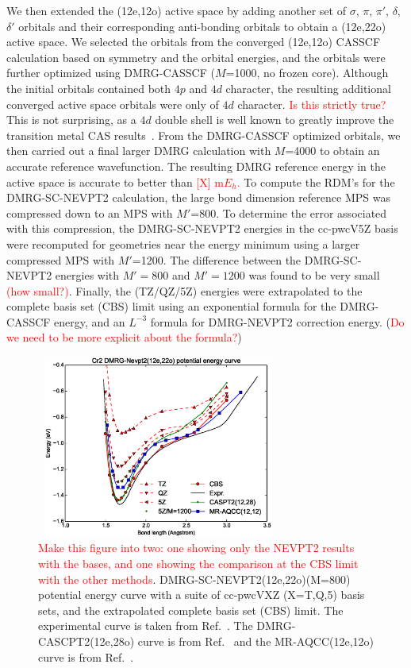 We then extended the (12e,12o) active space by adding another set of $\sigma$, $\pi$, $\pi'$, $\delta$, $\delta'$ orbitals and their corresponding anti-bonding orbitals 
to obtain a (12e,22o) active space. We selected the orbitals from the converged (12e,12o) CASSCF calculation based on symmetry and the orbital energies,
and the orbitals were further optimized using DMRG-CASSCF ($M$=1000, no frozen core). Although the initial orbitals contained both $4p$ and $4d$ character, 
the resulting additional converged active space orbitals were only of $4d$ character. \textcolor{red}{Is this strictly true?} This is not surprising, as a $4d$ double shell is well known to greatly improve the transition metal CAS results~\cite{andersson_excitation_1992}.
From the DMRG-CASSCF optimized orbitals, we then carried out a final larger DMRG calculation with $M$=4000 to obtain an accurate reference wavefunction.
The resulting DMRG reference energy in the active space is accurate to better than \textcolor{red}{[X] m$E_h$.}
To compute the RDM's for the DMRG-SC-NEVPT2 calculation, the large bond dimension reference MPS was compressed down to an MPS with $M'$=800. 
To determine the error associated with this compression, the DMRG-SC-NEVPT2 energies in the cc-pwcV5Z basis 
were recomputed for geometries near the energy minimum using a larger compressed MPS with $M'$=1200. The difference between the DMRG-SC-NEVPT2 energies with $M'=800$ and $M'=1200$ 
was found to be very small \textcolor{red}{(how small?)}. Finally, the (TZ/QZ/5Z) 
energies were extrapolated to the complete basis set (CBS) limit using
an exponential formula for the DMRG-CASSCF energy, and an $L^{-3}$ formula for DMRG-NEVPT2 correction energy. (\textcolor{red}{Do we need to be more explicit about the formula?})

\begin{figure}
  \includegraphics[width=8cm,height=6cm]{application/5qt-fitting.eps}
  \caption{\textcolor{red}{Make this figure into two: one showing only the NEVPT2 results with the bases, and one showing the comparison at the
CBS limit with the other methods}. DMRG-SC-NEVPT2(12e,22o)(M=800) potential energy curve with a suite of cc-pwcVXZ (X=T,Q,5) basis sets, and the extrapolated complete basis set (CBS) limit. 
The experimental curve is taken from Ref.~. The DMRG-CASCPT2(12e,28o) curve is from Ref.~ and the MR-AQCC(12e,12o) curve is from Ref.~.}
  \label{fig:5qt_fitting}
\end{figure}


